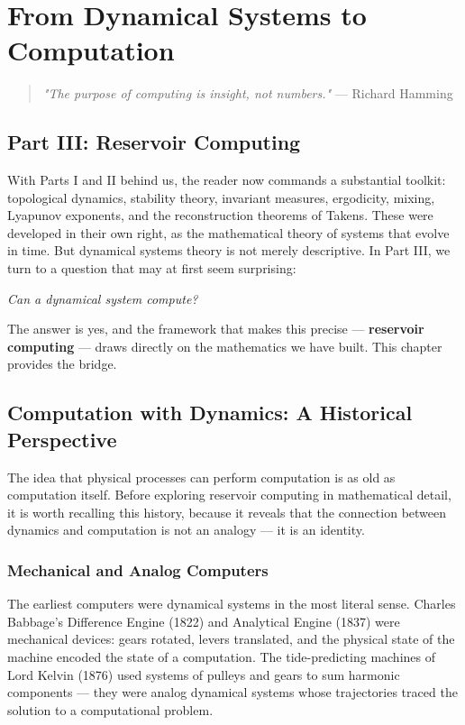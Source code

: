 \chapter{From Dynamical Systems to Computation}\label{ch:13}

\begin{quote}
\textit{"The purpose of computing is insight, not numbers."}
--- Richard Hamming
\end{quote}


\bigskip


\section{Part III: Reservoir Computing}

With Parts I and II behind us, the reader now commands a substantial toolkit: topological dynamics, stability theory, invariant measures, ergodicity, mixing, Lyapunov exponents, and the reconstruction theorems of Takens. These were developed in their own right, as the mathematical theory of systems that evolve in time. But dynamical systems theory is not merely descriptive. In Part III, we turn to a question that may at first seem surprising:

\textit{Can a dynamical system compute?}

The answer is yes, and the framework that makes this precise --- \textbf{reservoir computing} --- draws directly on the mathematics we have built. This chapter provides the bridge.


\bigskip


\section{Computation with Dynamics: A Historical Perspective}\label{sec:13.1}

The idea that physical processes can perform computation is as old as computation itself. Before exploring reservoir computing in mathematical detail, it is worth recalling this history, because it reveals that the connection between dynamics and computation is not an analogy --- it is an identity.

\subsection{Mechanical and Analog Computers}\label{sec:13.1.1}

The earliest computers were dynamical systems in the most literal sense. Charles Babbage's Difference Engine (1822) and Analytical Engine (1837) were mechanical devices: gears rotated, levers translated, and the physical state of the machine encoded the state of a computation. The tide-predicting machines of Lord Kelvin (1876) used systems of pulleys and gears to sum harmonic components --- they were analog dynamical systems whose trajectories traced the solution to a computational problem.

